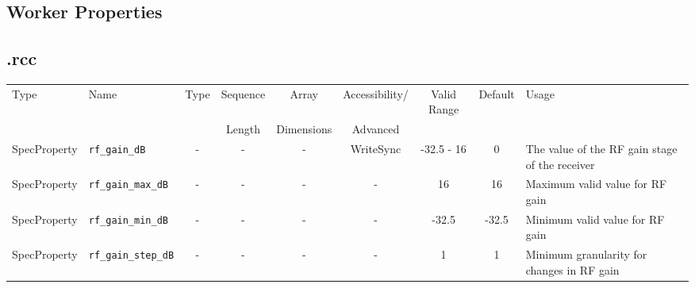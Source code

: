 \begin{landscape}
	\section*{Worker Properties}
	\subsection*{\comp.rcc}
	\begin{scriptsize}
		\begin{tabular}{|p{2cm}|p{4cm}|c|c|c|c|c|c|p{6.5cm}|}
			\hline
			\rowcolor{blue}
			Type         & Name                                & Type & Sequence & Array      & Accessibility/ & Valid Range  & Default & Usage                                                                                                                                                                                                                       \\
			\rowcolor{blue}
			             &                                     &      & Length   & Dimensions & Advanced       &              &         &                                                                                                                                                                                                                             \\
			\hline
			SpecProperty & \verb+rf_gain_dB+                   & -    & -        & -          & WriteSync      & -32.5 - 16   & 0       & The value of the RF gain stage of the receiver                                                                                                                                                                              \\
			\hline
			SpecProperty & \verb+rf_gain_max_dB+               & -    & -        & -          & -              & 16           & 16      & Maximum valid value for RF gain                                                                                                                                                                                             \\
			\hline
			SpecProperty & \verb+rf_gain_min_dB+               & -    & -        & -          & -              & -32.5        & -32.5   & Minimum valid value for RF gain                                                                                                                                                                                             \\
			\hline
			SpecProperty & \verb+rf_gain_step_dB+              & -    & -        & -          & -              & 1            & 1       & Minimum granularity for changes in RF gain                                                                                                                                                                                  \\

\end{tabular}
\end{scriptsize}
\end{landscape}
